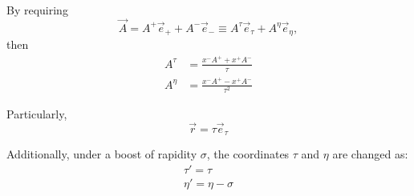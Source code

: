 By requiring
\begin{equation*}
  \vec{A} = A^+ \vec{e}_+ + A^- \vec{e}_- \equiv A^\tau \vec{e}_\tau + A^\eta \vec{e}_\eta,
\end{equation*}
\noindent then
\begin{equation}
  \begin{split}
    A^\tau & = \frac{x^- A^+ + x^+ A^-}{\tau} \\
    A^\eta & = \frac{x^- A^+ - x^+ A^-}{\tau^2}
  \end{split}
\end{equation}

Particularly,
\begin{equation}
  \vec{r} = \tau \vec{e}_\tau
\end{equation}

\color{purple}
Additionally, under a boost of rapidity $\sigma$, the coordinates $\tau$ and $\eta$ are changed as:
\begin{subequations}
  \begin{gather}
    \tau' = \tau \\
    \eta' = \eta - \sigma
  \end{gather}
\end{subequations}
\color{black}
